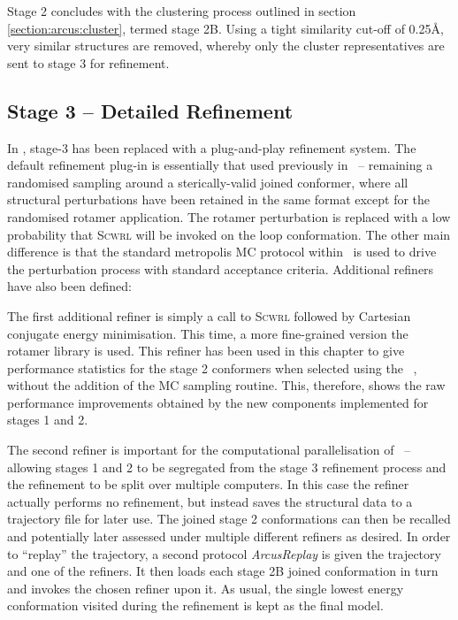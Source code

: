 Stage 2 concludes with the clustering process outlined in section \ref{section:arcus:cluster}, termed stage 2B. Using a tight similarity cut-off of 0.25\AA, very similar structures are removed, whereby only the cluster representatives are sent to stage 3 for refinement.

\subsection{Stage 3 -- Detailed Refinement}
\label{section:arcus:stage3}

In \arcus, stage-3 has been replaced with a plug-and-play refinement system. The default refinement plug-in is essentially that used previously in \prearcus\ --   remaining a randomised sampling around a sterically-valid  joined conformer, where all structural perturbations have been retained in the same format except for the randomised rotamer application.
The rotamer perturbation is replaced with a low probability that \textsc{Scwrl} will be invoked on the loop conformation. The other main difference is that the standard metropolis MC protocol within \pd\ is used to drive the perturbation process with standard acceptance criteria. Additional refiners have also been defined: 

The first additional refiner is simply a call to \textsc{Scwrl} followed by Cartesian conjugate energy minimisation. This time, a more fine-grained version the rotamer library is used. This refiner has been used in this chapter to give performance statistics for the stage 2 conformers when selected using the \ambergbsa\ \forcefield, without the addition of the MC sampling routine. This, therefore, shows the raw performance improvements obtained by the new components implemented for stages 1 and 2.

The second refiner is important for the computational parallelisation of \arcus\ -- allowing stages 1 and 2 to be segregated from the stage 3 refinement process and the refinement to be split over multiple computers. In this case the refiner actually performs no refinement, but instead saves the structural data to a trajectory file for later use. The joined stage 2 conformations can then be recalled and potentially later assessed under multiple different refiners as desired. In order to ``replay'' the trajectory, a second protocol \textit{ArcusReplay} is given the trajectory and one of the refiners. It then loads each stage 2B joined conformation in turn and invokes the chosen refiner upon it.
As usual, the single lowest energy conformation visited during the refinement is kept as the final model.

